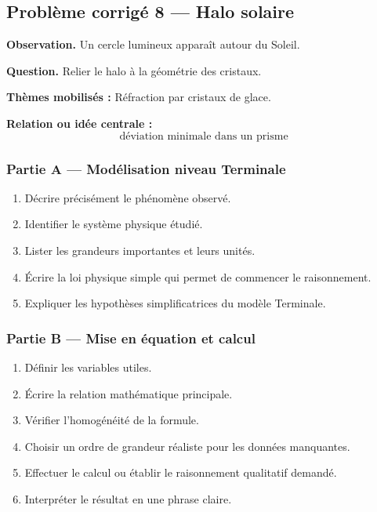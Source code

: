 \documentclass[11pt,a4paper]{article}
\begin{document}
\subsection{Problème corrigé 8 — Halo solaire}

\begin{exercicebox}
\textbf{Observation.} Un cercle lumineux apparaît autour du Soleil.

\medskip
\textbf{Question.} Relier le halo à la géométrie des cristaux.

\medskip
\textbf{Thèmes mobilisés :} Réfraction par cristaux de glace.

\medskip
\textbf{Relation ou idée centrale :}
\[
\text{déviation minimale dans un prisme}
\]
\end{exercicebox}

\subsubsection*{Partie A — Modélisation niveau Terminale}

\begin{enumerate}
  \item Décrire précisément le phénomène observé.
  \item Identifier le système physique étudié.
  \item Lister les grandeurs importantes et leurs unités.
  \item Écrire la loi physique simple qui permet de commencer le raisonnement.
  \item Expliquer les hypothèses simplificatrices du modèle Terminale.
\end{enumerate}

\subsubsection*{Partie B — Mise en équation et calcul}

\begin{enumerate}
  \item Définir les variables utiles.
  \item Écrire la relation mathématique principale.
  \item Vérifier l'homogénéité de la formule.
  \item Choisir un ordre de grandeur réaliste pour les données manquantes.
  \item Effectuer le calcul ou établir le raisonnement qualitatif demandé.
  \item Interpréter le résultat en une phrase claire.
\end{enumerate}
\end{document}
